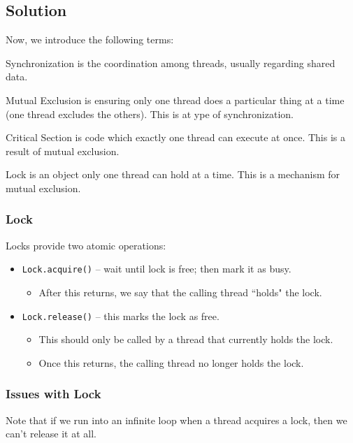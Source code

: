 \documentclass[openany]{book}
\begin{document}
\subsection{Solution}
Now, we introduce the following terms:
\begin{defn}[Synchronization]
	Synchronization is the coordination among threads, usually regarding shared data.
\end{defn}

\begin{defn}
	Mutual Exclusion is ensuring only one thread does a particular thing at a time (one thread excludes the others). This is at ype of synchronization.
\end{defn}

\begin{defn}
	Critical Section is code which exactly one thread can execute at once. This is a result of mutual exclusion.
\end{defn}

\begin{defn}[Lock]
	Lock is an object only one thread can hold at a time. This is a mechanism for mutual exclusion.
\end{defn}

\subsubsection{Lock}
Locks provide two atomic operations:
\begin{itemize}
	\item \texttt{Lock.acquire()} -- wait until lock is free; then mark it as busy.
	\begin{itemize}
		\item After this returns, we say that the calling thread ``holds" the lock.
	\end{itemize}
	\item \texttt{Lock.release()} -- this marks the lock as free.
	\begin{itemize}
		\item This should only be called by a thread that currently holds the lock.
		\item Once this returns, the calling thread no longer holds the lock.
	\end{itemize}
\end{itemize}

\subsubsection{Issues with Lock}
Note that if we run into an infinite loop when a thread acquires a lock, then we can't release it at all.
\end{document}
